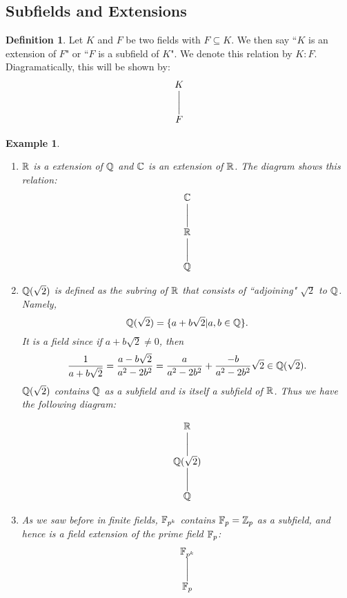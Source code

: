 \documentclass[12pt]{article}
\theoremstyle{plain}
\newtheorem{example}{Example}
\theoremstyle{definition}
\newtheorem{definition}{Definition}
\theoremstyle{remark}
\newcommand{\ext}[1]{%
  \hphantom{\scriptstyle#1}\bigg|{\scriptstyle#1}%
  }
\begin{document}
\subsection{Subfields and Extensions}
\begin{definition}
Let $K$ and $F$ be two fields with $F\subseteq K$. We then say ``$K$ is an extension of $F$" or ``$F$ is a subfield of $K$". We denote this relation by $K:F$. 
Diagramatically, this will be shown by:
\[
\begin{array}{@{}c@{}}
K\\
\ext{} \\
F \\
\end{array}
\]

\end{definition}
\begin{example}
\begin{enumerate}
    \item $\mathbb{R}$ is a extension of $\mathbb{Q}$ and $\mathbb{C}$ is an extension of $\mathbb{R}$. 
    The diagram shows this relation:
\[
\begin{array}{@{}c@{}}
\mathbb{C}\\
\ext{} \\
\mathbb{R} \\
\ext{} \\
\mathbb{Q}
\end{array}
\]

\item $\mathbb{Q}(\sqrt{2})$ is defined as the subring of $\mathbb{R}$ that consists of ``adjoining" $\sqrt{2}$ to $\mathbb{Q}$. Namely, 
$$\mathbb{Q}(\sqrt{2})=\{a+b\sqrt{2}|a,b\in \mathbb{Q}\}.$$
It is a field since if $a+b\sqrt{2}\neq 0$, then  
$$\frac{1}{a+b\sqrt{2}} = \frac{a-b\sqrt{2}}{a^2-2b^2} = \frac{a}{a^2-2b^2}+\frac{-b}{a^2-2b^2}\sqrt{2} \in \mathbb{Q}(\sqrt{2}).$$
$\mathbb{Q}(\sqrt{2})$ contains $\mathbb{Q}$ as a subfield and is itself a subfield of $\mathbb{R}$. Thus we have the following diagram:

\[
\begin{array}{@{}c@{}}
\mathbb{R}\\
\ext{} \\
\mathbb{Q}(\sqrt{2}) \\
\ext{} \\
\mathbb{Q}
\end{array}
\]
\item As we saw before in finite fields, $\mathbb{F}_{p^k}$ contains $\mathbb{F}_p=\mathbb{Z}_p$ as a subfield, and hence is a field extension of the prime field $\mathbb{F}_p$:
\[
\begin{array}{@{}c@{}}
\mathbb{F}_{p^k}\\
\ext{} \\
\mathbb{F}_p \\
\end{array}
\]
\end{enumerate}
\end{example}
\end{document}

